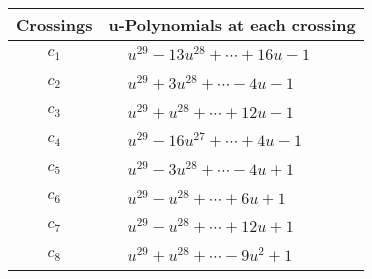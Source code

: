 \documentclass[1p]{elsarticle_modified}
\theoremstyle{definition}
\begin{document}
\begin{tabular}{m{50pt}|m{274pt}}
Crossings & \hspace{64pt}u-Polynomials at each crossing \\
\hline $$\begin{aligned}c_{1}\end{aligned}$$&$\begin{aligned}
&u^{29}-13 u^{28}+\cdots+16 u-1
\end{aligned}$\\
\hline $$\begin{aligned}c_{2}\end{aligned}$$&$\begin{aligned}
&u^{29}+3 u^{28}+\cdots-4 u-1
\end{aligned}$\\
\hline $$\begin{aligned}c_{3}\end{aligned}$$&$\begin{aligned}
&u^{29}+u^{28}+\cdots+12 u-1
\end{aligned}$\\
\hline $$\begin{aligned}c_{4}\end{aligned}$$&$\begin{aligned}
&u^{29}-16 u^{27}+\cdots+4 u-1
\end{aligned}$\\
\hline $$\begin{aligned}c_{5}\end{aligned}$$&$\begin{aligned}
&u^{29}-3 u^{28}+\cdots-4 u+1
\end{aligned}$\\
\hline $$\begin{aligned}c_{6}\end{aligned}$$&$\begin{aligned}
&u^{29}- u^{28}+\cdots+6 u+1
\end{aligned}$\\
\hline $$\begin{aligned}c_{7}\end{aligned}$$&$\begin{aligned}
&u^{29}- u^{28}+\cdots+12 u+1
\end{aligned}$\\
\hline $$\begin{aligned}c_{8}\end{aligned}$$&$\begin{aligned}
&u^{29}+u^{28}+\cdots-9 u^2+1
\end{aligned}$\\

\end{tabular}
\end{document}
